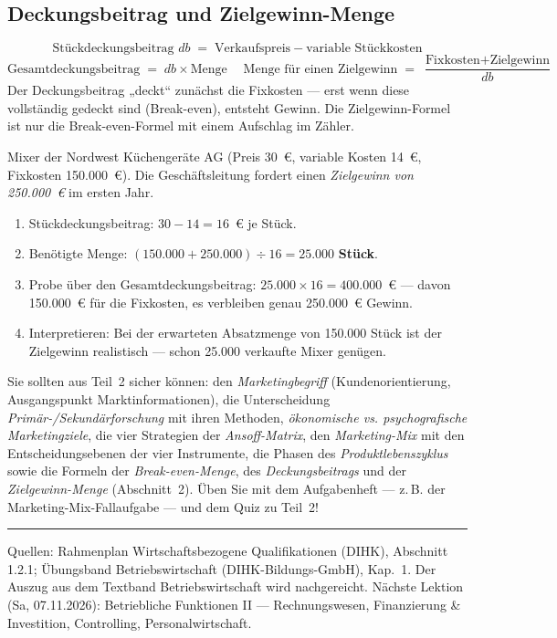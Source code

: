 \documentclass[11pt, a4paper]{article}
\begin{document}
\subsection{Deckungsbeitrag und Zielgewinn-Menge}

\begin{merksatz}[title={\bfseries Formeln: Deckungsbeitrag und Zielgewinn-Menge}]
\[
\text{Stückdeckungsbeitrag } db \;=\; \text{Verkaufspreis} - \text{variable Stückkosten}
\]
\[
\text{Gesamtdeckungsbeitrag} \;=\; db \times \text{Menge}
\quad\;
\text{Menge für einen Zielgewinn} \;=\; \frac{\text{Fixkosten} + \text{Zielgewinn}}{db}
\]
Der Deckungsbeitrag „deckt`` zunächst die Fixkosten --- erst wenn diese vollständig
gedeckt sind (Break-even), entsteht Gewinn. Die Zielgewinn-Formel ist nur die
Break-even-Formel mit einem Aufschlag im Zähler.
\end{merksatz}

\begin{beispiel}
Mixer der Nordwest Küchengeräte AG (Preis 30~€, variable Kosten 14~€, Fixkosten
150.000~€). Die Geschäftsleitung fordert einen \emph{Zielgewinn von 250.000~€} im
ersten Jahr.
\begin{enumerate}
  \item Stückdeckungsbeitrag: $30 - 14 = 16$~€ je Stück.
  \item Benötigte Menge: $(150.000 + 250.000) \div 16 = 25.000$ \textbf{Stück}.
  \item Probe über den Gesamtdeckungsbeitrag: $25.000 \times 16 = 400.000$~€ ---
    davon 150.000~€ für die Fixkosten, es verbleiben genau 250.000~€ Gewinn.
  \item Interpretieren: Bei der erwarteten Absatzmenge von 150.000 Stück ist der
    Zielgewinn realistisch --- schon 25.000 verkaufte Mixer genügen.
\end{enumerate}
\end{beispiel}

\begin{merksatz}[title={\bfseries Wichtig für die Prüfungsvorbereitung}]
Sie sollten aus Teil~2 sicher können: den \emph{Marketingbegriff} (Kundenorientierung,
Ausgangspunkt Marktinformationen), die Unterscheidung \emph{Primär-/Sekundärforschung}
mit ihren Methoden, \emph{ökonomische vs. psychografische Marketingziele}, die vier
Strategien der \emph{Ansoff-Matrix}, den \emph{Marketing-Mix} mit den
Entscheidungsebenen der vier Instrumente, die Phasen des \emph{Produktlebenszyklus}
sowie die Formeln der \emph{Break-even-Menge}, des \emph{Deckungsbeitrags} und der
\emph{Zielgewinn-Menge} (Abschnitt~2). Üben Sie mit dem
Aufgabenheft --- z.\,B. der Marketing-Mix-Fallaufgabe --- und dem Quiz zu Teil~2!
\end{merksatz}

\vspace{1em}
\hrule
\vspace{0.8em}
\noindent\textsf{\small Quellen: Rahmenplan Wirtschaftsbezogene Qualifikationen (DIHK), Abschnitt 1.2.1;
Übungsband Betriebswirtschaft (DIHK-Bildungs-GmbH), Kap.~1. Der Auszug aus dem Textband
Betriebswirtschaft wird nachgereicht. Nächste Lektion (Sa, 07.11.2026): Betriebliche Funktionen II ---
Rechnungswesen, Finanzierung \& Investition, Controlling, Personalwirtschaft.}
\end{document}
